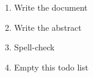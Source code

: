 \begin{enumerate}
\item Write the document
\item Write the abstract
\item Spell-check
\item Empty this todo list
\end{enumerate}
